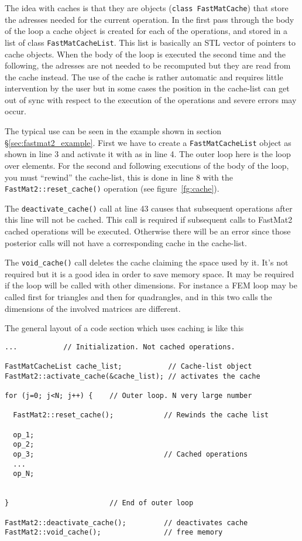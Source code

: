 The idea with caches is that they are objects
(\verb+class FastMatCache+) that store the adresses needed for the
current operation. In the first pass through the body of the loop a
cache object is created for each of the operations, and stored in a
list of class \verb+FastMatCacheList+. This list is basically an STL
vector of pointers to cache objects. When the body of the loop is
executed the second time and the following, the adresses are not
needed to be recomputed but they are read from the cache instead. The
use of the cache is rather automatic and requires little intervention
by the user but in some cases the position in the cache-list can get
out of sync with respect to the execution of the operations and severe
errors may occur.

The typical use can be seen in the example shown in section
\S\ref{sec:fastmat2_example}. First we have to create a
\verb+FastMatCacheList+ object as shown in line 3 and activate it with
as in line 4. The outer loop here is the loop over elements. For the
second and following executions of the body of the loop, you must
``rewind'' the cache-list, this is done in line 8 with the
\verb+FastMat2::reset_cache()+ operation (see figure~\ref{fg:cache}).

The \verb+deactivate_cache()+ call at line 43 causes that subsequent
operations after this line will not be cached. This call is required
if subsequent calls to FastMat2 cached operations will be
executed. Otherwise there will be an error since those posterior calls
will not have a corresponding cache in the cache-list. 

The \verb+void_cache()+ call deletes the cache claiming the space used
by it. It's not required but it is a good idea in order to save memory
space. It may be required if the loop will be called with other
dimensions. For instance a FEM loop may be called first for triangles
and then for quadrangles, and in this two calls the dimensions of the
involved matrices are different. 

The general layout of a code section which uses caching is like this
%
\begin{verbatim}
...           // Initialization. Not cached operations. 

FastMatCacheList cache_list;           // Cache-list object
FastMat2::activate_cache(&cache_list); // activates the cache

for (j=0; j<N; j++) {    // Outer loop. N very large number

  FastMat2::reset_cache();            // Rewinds the cache list
          
  op_1;
  op_2;
  op_3;                               // Cached operations 
  ...                                       
  op_N;
  
   
}                        // End of outer loop 

FastMat2::deactivate_cache();         // deactivates cache
FastMat2::void_cache();               // free memory
\end{verbatim}

